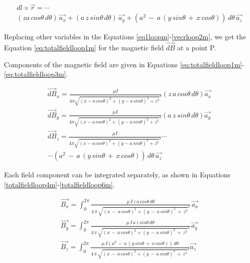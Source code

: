 \documentclass{ximera}
\begin{document}
\begin{eqnarray}
dl\times \vec{r} =\cdots \nonumber \\ (z a \, cos\theta \,d\theta) \,\vec{a_x}  + (a\, z \,sin\theta \,d\theta) \,\vec{a_y} + (a^2 \,-\,a \,(y\, sin\theta\, +\, x \,cos\theta))\, d\theta \,\vec{a_z} 
\end{eqnarray}


Replacing other variables in the Equations \ref{eq1loopm}-\ref{vecrloop2m}, we get the    Equation \ref{eq:totalfieldloop1m} for the magnetic field $\vec{dB}$ at a point P.

Components of the magnetic field are given in Equations \ref{eq:totalfieldloop1m}-\ref{eq:totalfieldloop3m}.

\begin{eqnarray}
\label{eq:totalfieldloop1m} \vec{dB}_x = \frac{\mu I}{4 \pi \sqrt{(x - a \,cos{\theta})^2 +(y - a \,sin{\theta})^2 +z ^2}^3 } (z \, a \, cos\theta \, d\theta) \vec{a_x}    \\
\label{eq:totalfieldloop2m}  \vec{dB}_y= \frac{\mu I}{4 \pi \sqrt{(x - a \,cos{\theta})^2 +(y - a \,sin{\theta})^2 +z ^2}^3 } (a \, z \, sin\theta \, d\theta) \vec{a_y} \\
 \label{eq:totalfieldloop3m}\vec{dB}_z=  
\frac{\mu I}{4 \pi \sqrt{(x - a \,cos{\theta})^2 +(y - a \,sin{\theta})^2 +z ^2}^3 } \cdots \nonumber \\ \cdots (a^2 \, -\, a \, (y\,  sin\theta\, + \,x\, cos\theta)) \, d\theta \, \vec{a_z} 
\end{eqnarray}


Each field component can be integrated separately, as shown in Equations \ref{totalfieldloop4m}-\ref{totalfieldloop6m}.



\begin{eqnarray}
\vec{B_x}= \int_0^{2\pi}\frac{\mu\,  I\,  z\,  a\,  cos\theta \, d\theta}{4 \, \pi\,  \sqrt{(x\,  - \, a \,cos{\theta})^2 +(y \,- \,a \,sin{\theta})^2 \,+\,z ^2}^3 }  \, \vec{a_x} \label{totalfieldloop4m} \\
\vec{B_y}=  \int_0^{2\pi} \frac{\mu \, I \, a \, z\, sin\theta\, d\theta}{4\, \pi \, \sqrt{(x \,-\,  a \,cos{\theta})^2 +(y \, - \, a \,sin{\theta})^2 \,+\, z ^2}^3 }  \, \vec{a_y} \label{totalfieldloop5m} \\
\vec{B_z}=  \int_0^{2\pi} \frac{\mu  \,I(a^2 \,-\,a\, (y\, sin\theta \,+\, x\, cos\theta))\,d\theta}{4 \,\pi\, \sqrt{(x\, -\, a \,cos{\theta})^2 +(y\, -\, a \,sin{\theta})^2 \,+\,z ^2}^3 }  \vec{a_z} \label{totalfieldloop6m}
\end{eqnarray}
\end{document}
